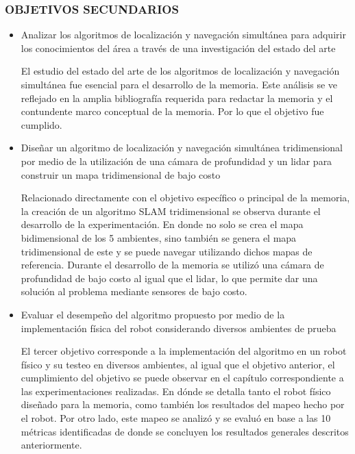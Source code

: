 \subsubsection{OBJETIVOS SECUNDARIOS}
\begin{itemize}
    \item Analizar los algoritmos de localización y navegación simultánea para adquirir los conocimientos del área a través de una investigación del estado del arte

    El estudio del estado del arte de los algoritmos de localización y navegación simultánea fue esencial para el desarrollo de la memoria. Este análisis se ve reflejado en la amplia bibliografía requerida para redactar la memoria y el contundente marco conceptual de la memoria. Por lo que el objetivo fue cumplido.
    
    \item Diseñar un algoritmo de localización y navegación simultánea tridimensional por medio de la utilización de una cámara de profundidad y un lidar para construir un mapa tridimensional de bajo costo

    Relacionado directamente con el objetivo específico o principal de la memoria, la creación de un algoritmo SLAM tridimensional se observa durante el desarrollo de la experimentación. En donde no solo se crea el mapa bidimensional de los 5 ambientes, sino también se genera el mapa tridimensional de este y se puede navegar utilizando dichos mapas de referencia. Durante el desarrollo de la memoria se utilizó una cámara de profundidad de bajo costo al igual que el lidar, lo que permite dar una solución al problema mediante sensores de bajo costo.

    
    \item Evaluar el desempeño del algoritmo propuesto por medio de la implementación física del robot considerando diversos ambientes de prueba

    El tercer objetivo corresponde a la implementación del algoritmo en un robot físico y su testeo en diversos ambientes, al igual que el objetivo anterior, el cumplimiento del objetivo se puede observar en el capítulo correspondiente a las experimentaciones realizadas. En dónde se detalla tanto el robot físico diseñado para la memoria, como también los resultados del mapeo hecho por el robot. Por otro lado, este mapeo se analizó y se evaluó en base a las 10 métricas identificadas de donde se concluyen los resultados generales descritos anteriormente.
\end{itemize}

